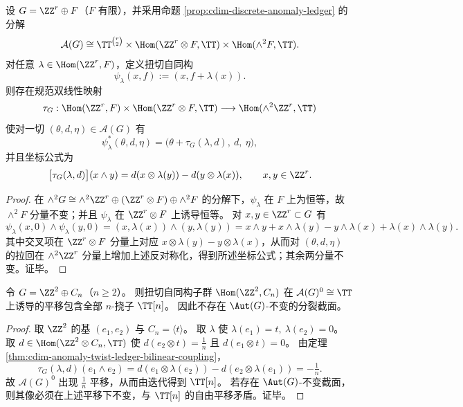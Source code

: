 \begin{theorem}[扭切自同构的双线性耦合公式]\label{thm:cdim-anomaly-twist-ledger-bilinear-coupling}
设 \(G=\ZZ^r\oplus F\)（\(F\) 有限），并采用命题 \ref{prop:cdim-discrete-anomaly-ledger} 的分解
\[
\mathcal A(G)\cong
\TT^{\binom r2}\times \Hom(\ZZ^r\otimes F,\TT)\times \Hom(\wedge^2F,\TT).
\]
对任意 \(\lambda\in\Hom(\ZZ^r,F)\)，定义扭切自同构
\[
\psi_\lambda(x,f):=(x,f+\lambda(x)).
\]
则存在规范双线性映射
\[
\tau_G:\Hom(\ZZ^r,F)\times \Hom(\ZZ^r\otimes F,\TT)\longrightarrow \Hom(\wedge^2\ZZ^r,\TT)
\]
使对一切 \((\theta,d,\eta)\in \mathcal A(G)\) 有
\[
\psi_\lambda^\ast(\theta,d,\eta)=\bigl(\theta+\tau_G(\lambda,d),\ d,\ \eta\bigr),
\]
并且坐标公式为
\[
\bigl[\tau_G(\lambda,d)\bigr](x\wedge y)=d(x\otimes \lambda(y))-d(y\otimes \lambda(x)),
\qquad x,y\in\ZZ^r.
\]
\end{theorem}
\begin{proof}
在 \(\wedge^2G\cong \wedge^2\ZZ^r\oplus(\ZZ^r\otimes F)\oplus\wedge^2F\) 的分解下，\(\psi_\lambda\) 在 \(F\) 上为恒等，故 \(\wedge^2F\) 分量不变；并且 \(\psi_\lambda\) 在 \(\ZZ^r\otimes F\) 上诱导恒等。
对 \(x,y\in\ZZ^r\subset G\) 有
\[
\psi_\lambda(x,0)\wedge\psi_\lambda(y,0)
=(x,\lambda(x))\wedge(y,\lambda(y))
=x\wedge y+x\wedge\lambda(y)-y\wedge\lambda(x)+\lambda(x)\wedge\lambda(y).
\]
其中交叉项在 \(\ZZ^r\otimes F\) 分量上对应 \(x\otimes\lambda(y)-y\otimes\lambda(x)\)，从而对 \((\theta,d,\eta)\) 的拉回在 \(\wedge^2\ZZ^r\) 分量上增加上述反对称化，得到所述坐标公式；其余两分量不变。证毕。
\end{proof}

\begin{corollary}[秩 \(2\) 情形的满挠平移与不变截面不存在]\label{cor:cdim-anomaly-rank2-full-torsion-translation}
令 \(G=\ZZ^2\oplus C_n\)（\(n\ge 2\)）。
则扭切自同构子群 \(\Hom(\ZZ^2,C_n)\) 在 \(\mathcal A(G)^0\cong\TT\) 上诱导的平移包含全部 \(n\)-挠子 \(\TT[n]\)。
因此不存在 \(\Aut(G)\)-不变的分裂截面。
\end{corollary}
\begin{proof}
取 \(\ZZ^2\) 的基 \((e_1,e_2)\) 与 \(C_n=\langle t\rangle\)。
取 \(\lambda\) 使 \(\lambda(e_1)=t,\ \lambda(e_2)=0\)。
取 \(d\in\Hom(\ZZ^2\otimes C_n,\TT)\) 使 \(d(e_2\otimes t)=\tfrac1n\) 且 \(d(e_1\otimes t)=0\)。
由定理 \ref{thm:cdim-anomaly-twist-ledger-bilinear-coupling}，
\[
\tau_G(\lambda,d)(e_1\wedge e_2)=d(e_1\otimes\lambda(e_2))-d(e_2\otimes\lambda(e_1))=-\tfrac1n.
\]
故 \(\mathcal A(G)^0\) 出现 \(\tfrac1n\) 平移，从而由迭代得到 \(\TT[n]\)。
若存在 \(\Aut(G)\)-不变截面，则其像必须在上述平移下不变，与 \(\TT[n]\) 的自由平移矛盾。证毕。
\end{proof}





\endinput

